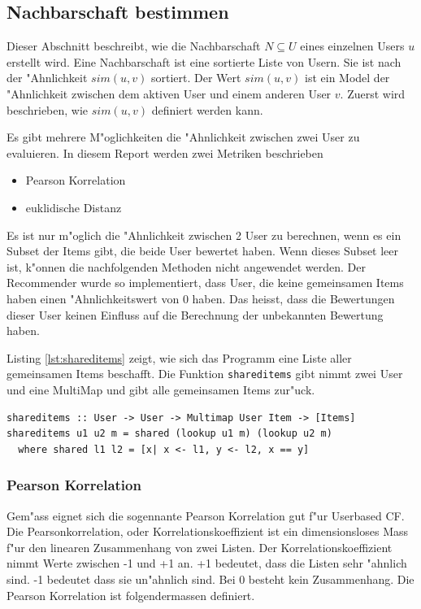 \documentclass[a4paper, 12pt]{article}
\begin{document}
\subsection{Nachbarschaft bestimmen}
\label{sec:neigborhood}

Dieser Abschnitt beschreibt, wie die Nachbarschaft  $N \subseteq U$ eines einzelnen Users $u$ erstellt wird. Eine Nachbarschaft ist eine sortierte Liste von Usern. Sie ist nach der "Ahnlichkeit $sim(u,v)$ sortiert.  Der Wert $sim(u,v)$ ist ein Model der "Ahnlichkeit zwischen dem aktiven User und einem anderen User $v$. Zuerst wird beschrieben, wie $sim(u,v)$ definiert werden kann.

Es gibt mehrere M"oglichkeiten die "Ahnlichkeit zwischen zwei User zu evaluieren. In diesem Report werden zwei Metriken beschrieben

\begin{itemize}
  \item Pearson Korrelation 
  \item euklidische Distanz
\end{itemize}

Es ist nur m"oglich die "Ahnlichkeit zwischen 2 User zu berechnen, wenn es ein Subset der Items gibt, die beide User bewertet haben. Wenn dieses Subset leer ist, k"onnen die nachfolgenden Methoden nicht angewendet werden. Der Recommender wurde so implementiert, dass User, die keine gemeinsamen Items haben einen "Ahnlichkeitswert von 0 haben. Das heisst, dass die Bewertungen dieser User keinen Einfluss auf die Berechnung der unbekannten Bewertung haben. 

Listing \ref{lst:shareditems} zeigt, wie sich das Programm eine Liste aller gemeinsamen Items beschafft. Die Funktion \verb|shareditems| gibt nimmt zwei User und eine MultiMap und gibt alle gemeinsamen Items zur"uck. 

\begin{lstlisting}[caption=Implementation von shareditems, label=lst:shareditems]
shareditems :: User -> User -> Multimap User Item -> [Items]
shareditems u1 u2 m = shared (lookup u1 m) (lookup u2 m)
  where shared l1 l2 = [x| x <- l1, y <- l2, x == y]
\end{lstlisting}

\subsubsection{Pearson Korrelation}
\label{sec:pearsoncorrelation}

Gem"ass \cite{jannach11} eignet sich die sogennante Pearson Korrelation gut f"ur Userbased CF. Die Pearsonkorrelation, oder Korrelationskoeffizient ist ein dimensionsloses Mass f"ur den linearen Zusammenhang von zwei Listen. Der Korrelationskoeffizient nimmt Werte zwischen -1 und +1 an. +1 bedeutet, dass die Listen sehr "ahnlich sind. -1 bedeutet dass sie un"ahnlich sind. Bei 0 besteht kein Zusammenhang. Die Pearson Korrelation ist folgendermassen definiert.
\end{document}
